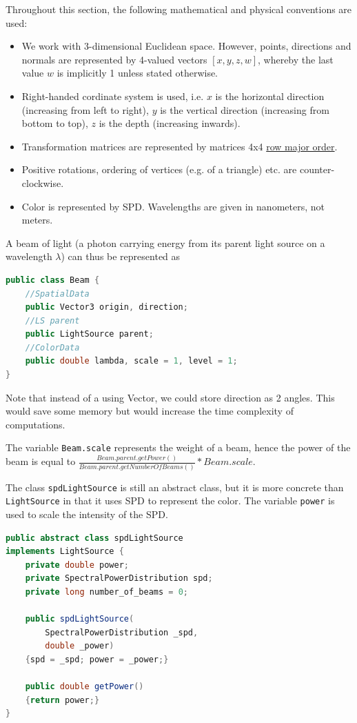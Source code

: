 \documentclass[12pt, letterpaper]{article}
\begin{document}
Throughout this section, the following mathematical and physical conventions are used:
\begin{itemize}
\item We work with 3-dimensional Euclidean space. However, points, directions and normals are represented by 4-valued vectors $[x, y, z, w]$, whereby the last value $w$ is implicitly 1 unless stated otherwise.
\item Right-handed cordinate system is used, i.e. $x$ is the horizontal direction (increasing from left to right), $y$ is the vertical direction (increasing from bottom to top), $z$ is the depth (increasing inwards).
\item Transformation matrices are represented by matrices 4x4 \href{https://en.wikipedia.org/wiki/Row-_and_column-major_order}{row major order}.
\item Positive rotations, ordering of vertices  (e.g. of a triangle) etc. are counter-clockwise.
\item Color is represented by SPD. Wavelengths are given in nanometers, not meters.
\end{itemize}

A beam of light (a photon carrying energy from its parent light source on a wavelength $\lambda$) can thus be represented as
\begin{lstlisting}[language=Java]
public class Beam {
	//SpatialData
	public Vector3 origin, direction;
	//LS parent
	public LightSource parent;
	//ColorData
	public double lambda, scale = 1, level = 1;
}
\end{lstlisting}

Note that instead of a using Vector, we could store direction as 2 angles. This would save some memory but would increase the time complexity of computations.

The variable \verb|Beam.scale| represents the weight of a beam, hence the power of the beam is equal to $\frac{Beam.parent.getPower()}{Beam.parent.getNumberOfBeams()} * Beam.scale$. 

The class \verb|spdLightSource| is still an abstract class, but it is more concrete than \verb|LightSource| in that it uses SPD to represent the color. The variable \verb|power| is used to scale the intensity of the SPD.
\begin{lstlisting}[language=Java]
public abstract class spdLightSource 
implements LightSource {
	private double power;
	private SpectralPowerDistribution spd;
	private long number_of_beams = 0;
	
	public spdLightSource(
		SpectralPowerDistribution _spd,
		double _power)
	{spd = _spd; power = _power;}
	
	public double getPower()
	{return power;}
}
\end{lstlisting}
\end{document}
